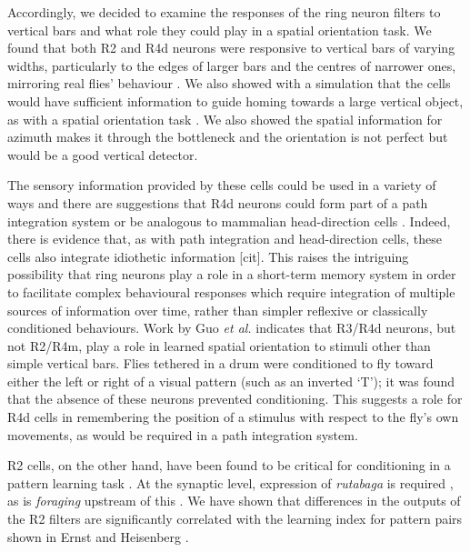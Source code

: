 Accordingly, we decided to examine the responses of the ring neuron filters to vertical bars and what role they could play in a spatial orientation task.
We found that both R2 and R4d neurons were responsive to vertical bars of varying widths, particularly to the edges of larger bars and the centres of narrower ones, mirroring real flies' behaviour \cite{Osorio1990}.
We also showed with a simulation that the cells would have sufficient information to guide homing towards a large vertical object, as with a spatial orientation task \cite{Neuser2008}.
We also showed the spatial information for azimuth makes it through the bottleneck and the orientation is not perfect but would be a good vertical detector.

The sensory information provided by these cells could be used in a variety of ways and there are suggestions that R4d neurons could form part of a path integration system \cite{Neuser2008} or be analogous to mammalian head-direction cells \cite{Tomchik2008}.
Indeed, there is evidence that, as with path integration and head-direction cells, these cells also integrate idiothetic information [cit].
This raises the intriguing possibility that ring neurons play a role in a short-term memory system in order to facilitate complex behavioural responses which require integration of multiple sources of information over time, rather than simpler reflexive or classically conditioned behaviours. %
Work by Guo \emph{et al.} \cite{Guo2015} indicates that R3/R4d neurons, but not R2/R4m, play a role in learned spatial orientation to stimuli other than simple vertical bars.
Flies tethered in a drum were conditioned to fly toward either the left or right of a visual pattern (such as an inverted `T'); it was found that the absence of these neurons prevented conditioning.
This suggests a role for R4d cells in remembering the position of a stimulus with respect to the fly's own movements, as would be required in a path integration system.

R2 cells, on the other hand, have been found to be critical for conditioning in a pattern learning task \cite{Pan2009}.
At the synaptic level, expression of \emph{rutabaga} is required \cite{Pan2009}, as is \emph{foraging} upstream of this \cite{Wang2008}. We have shown that differences in the outputs of the R2 filters are significantly correlated with the learning index for pattern pairs shown in Ernst and Heisenberg \cite{Ernst1999}.

